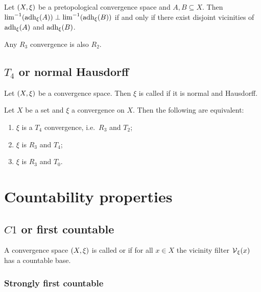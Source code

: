 \begin{proposition}
Let $\left( X,\xi \right)$ be a pretopological convergence space and $A,B\subseteq X$. Then $\lim^{-1}(\operatorname{adh}_\xi(A)) \perp \lim^{-1}(\operatorname{adh}_\xi(B))$ \textup{if and only if} there exist disjoint vicinities of $\operatorname{adh}_\xi(A)$ and $\operatorname{adh}_\xi(B)$.
\end{proposition}

\begin{proposition}
Any $R_3$ convergence is also $R_2$.
\end{proposition}


\subsection{$T_4$ or normal Hausdorff}
\begin{definition}
Let $\left( X,\xi \right)$ be a convergence space. Then $\xi$ is called  if it is normal and Hausdorff.
\end{definition}

\begin{proposition}
Let $X$ be a set and $\xi$ a convergence on $X$. Then the following are equivalent:
\begin{enumerate}
\item $\xi$ is a $T_4$ convergence, i.e.\ $R_3$ and $T_2$;
\item $\xi$ is $R_3$ and $T_4$;
\item $\xi$ is $R_3$ and $T_0$.
\end{enumerate}
\end{proposition}


\section{Countability properties}
\subsection{$C1$ or first countable}
\begin{definition}
A convergence space $\left( X, \xi \right)$ is called  or  if for all $x\in X$ the vicinity filter $\operatorname{\mathcal{V}}_\xi(x)$ has a countable base.
\end{definition}

\subsubsection{Strongly first countable}

